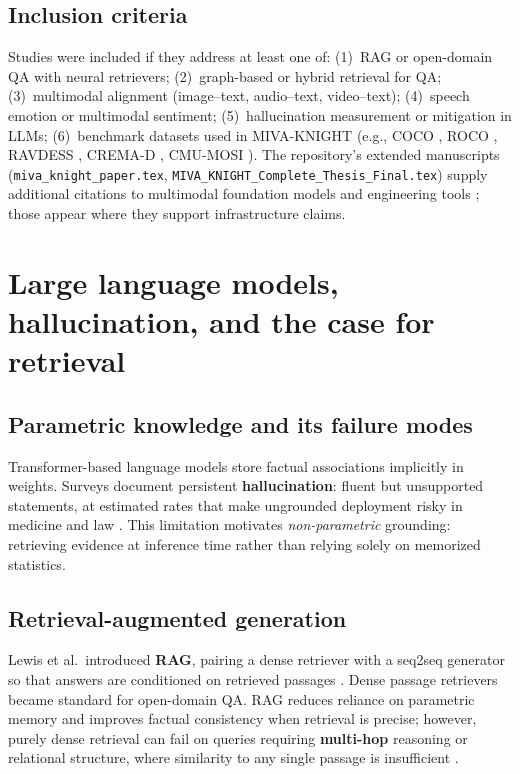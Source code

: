 \documentclass[12pt,a4paper]{article}
\begin{document}
\subsection{Inclusion criteria}

Studies were included if they address at least one of: (1)~RAG or open-domain QA with neural retrievers; (2)~graph-based or hybrid retrieval for QA; (3)~multimodal alignment (image--text, audio--text, video--text); (4)~speech emotion or multimodal sentiment; (5)~hallucination measurement or mitigation in LLMs; (6)~benchmark datasets used in MIVA-KNIGHT (e.g., COCO \cite{lin2014microsoft}, ROCO \cite{pelka2018radiology}, RAVDESS \cite{livingstone2018ryerson}, CREMA-D \cite{cao2014crema}, CMU-MOSI \cite{zadeh2016mosi}). The repository's extended manuscripts (\texttt{miva\_knight\_paper.tex}, \texttt{MIVA\_KNIGHT\_Complete\_Thesis\_Final.tex}) supply additional citations to multimodal foundation models and engineering tools \cite{wolf2020transformers,paszke2019pytorch,johnson2019billion}; those appear where they support infrastructure claims.

\section{Large language models, hallucination, and the case for retrieval}

\subsection{Parametric knowledge and its failure modes}

Transformer-based language models store factual associations implicitly in weights. Surveys document persistent \textbf{hallucination}: fluent but unsupported statements, at estimated rates that make ungrounded deployment risky in medicine and law \cite{zhang2023sirens,ji2023survey}. This limitation motivates \emph{non-parametric} grounding: retrieving evidence at inference time rather than relying solely on memorized statistics.

\subsection{Retrieval-augmented generation}

Lewis et al.\ introduced \textbf{RAG}, pairing a dense retriever with a seq2seq generator so that answers are conditioned on retrieved passages \cite{lewis2020rag}. Dense passage retrievers \cite{karpukhin2020dense} became standard for open-domain QA. RAG reduces reliance on parametric memory and improves factual consistency when retrieval is precise; however, purely dense retrieval can fail on queries requiring \textbf{multi-hop} reasoning or relational structure, where similarity to any single passage is insufficient \cite{yang2018hotpotqa,trivedi2022musique}.
\end{document}
